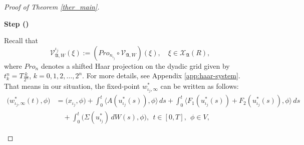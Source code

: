 \documentclass[english,a4paper,11pt]{amsart}
\theoremstyle{plain}
\newtheorem{claim}[theorem]{Claim}
\theoremstyle{definition}
\theoremstyle{remark}
\numberwithin{equation}{section}
\newcounter{lil1}
\newenvironment{step}
{\begin{list} { \bf Step (\Roman{lil1})}
		{ \usecounter{lil1}
			\setlength{\leftmargin}{0.0cm}
			\setlength{\topsep}{0.2cm}
			\setlength{\itemsep}{0.0cm}
			\setlength{\parsep}{0.1cm}
			\setlength{\itemindent}{0.8cm}
			\setlength{\parskip}{0.0cm}}}
	{\end{list}}
\newcounter{lil33}
\newcounter{lil1q}
\newcommand\del[1]{}
\newcommand\del[1]{}
\newcommand{\la}{\langle}
\newcommand{\ra}{\rangle}
\newcommand{\Pro}{Pro}
\begin{document}
\begin{proof}[Proof of Theorem \ref{ther_main}]
\begin{step}
\del{\begin{claim}\label{claim222}
	We claim that:
	\begin{enumerate}[(1)]
		\item there exists a constant $C>0$ such that 
		\[
		\sup_{j\in\mathbb{N}} \mathbb{E}^\ast \left[ \| w^\ast_{\iota_j,\infty} \|_{\mathbb{X}}^{m_0} \right] \leq C,
		\]
	\end{enumerate}
\end{claim}

\begin{proof}[Proof of Claim \ref{claim222}]
	Since $\{ w^\ast_{\iota_j,\infty} \}_{j\in\mathbb{N}} \subset \mathcal{X}(\mathfrak{A}^\ast)$ and $\mathcal{X}(\mathfrak{A}^\ast)$ is bounded in $\mathbb{X}$, we conclude from the application of Skorokhod’s lemma that
	\[
	\mathbb{E} \left\| w_{\iota_j,\infty} \right\|_{\mathbb{X}}^{r} = \mathbb{E}^\ast \left\| w^\ast_{\iota_j,\infty} \right\|_{\mathbb{X}}^{r},
	\]
	for all $r\in [1, m_0]$. Therefore, under assumption (iv), we obtain
	\[
	\sup_{j} \mathbb{E}^\ast \left\| w^\ast_{\iota_j,\infty} \right\|_{\mathbb{X}}^{m_0} \leq R \tilde{C} =: C,
	\]
	where $\tilde{C}>0$ is a constant satisfying $\| \cdot \|_{\mathbb{X}} \leq \tilde{C} \| \cdot \|_{\mathbb{X}_1}$, which exists due to the compact and dense embedding $\mathbb{X}_1 \hookrightarrow \mathbb{X}$.
	As a consequence, the family $\{ \| w^\ast_{\iota_j,\infty} \|_{\mathbb{X}}^r \}$ is uniformly integrable for any $r \in (1, m_0]$ with respect to $\mathbb{P}^\ast$.
	Next, we demonstrate that $\{ w_{\iota_j}^\ast : j\in\mathbb{N} \}$ is a Cauchy sequence in $\mathbb{X}$.}
Recall that
\[
\mathcal{V}^{\iota_j}_{\mathfrak{A},W}(\xi) :=  (\Pro_{n_{\iota_j}} \circ \mathcal{V}_{\mathfrak{A},W})(\xi), \quad \xi \in \mathcal{X}_{\mathfrak{A}}(R),
\]
where $ \Pro_{n}$ denotes a shifted Haar projection on the dyadic grid given by  $t^n_k= T\frac{k}{ 2^n}$, $k=0,1,2,\ldots,2^n$. For more details, see Appendix \ref{app:haar-system}.
That means in our situation, the fixed-point ${w}_{\iota_j,\infty}^\ast$ can be written as follows:
%
	\begin{align}\label{a1}\nonumber
		\big( {w}_{\iota_j,\infty}^\ast(t),\phi \big) 
		&=\big( x_{\iota_j},\phi\big) +\int_{0}^{t}\la  A ( u_{\iota_j}^\ast(s)),\phi \ra \,ds+\int_{0}^{t}\la F_1 ( u_{\iota_j}^\ast(s))+ F_2 ( u_{\iota_j}^\ast(s)),\phi \ra \,ds
	\\&\quad	+\int^t_0 \big( {\Sigma( {u}_{\iota_j}^\ast)}\,dW(s),\phi\big) , 
		\ \ t\in [0,T],\ \ \phi\in V, 
	\end{align} 

\end{step}
\end{proof}
\end{document}
